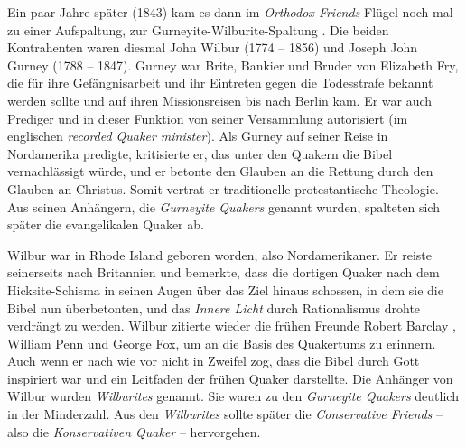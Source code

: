 Ein paar Jahre später (1843) kam es dann im \textit{Orthodox Friends}-Flügel
noch mal zu einer Aufspaltung, zur Gurneyite-Wilburite-Spaltung
. Die beiden
Kontrahenten waren diesmal John Wilbur (1774 -- 1856) und Joseph John Gurney
(1788 -- 1847). Gurney war Brite, Bankier
 und Bruder von Elizabeth Fry, die für
ihre Gefängnisarbeit und ihr Eintreten gegen
die Todesstrafe bekannt werden
sollte und auf ihren Missionsreisen bis nach Berlin kam.
Er war auch Prediger und in dieser Funktion
von seiner
Versammlung autorisiert (im englischen \textit{recorded Quaker minister}). Als
Gurney auf seiner Reise in Nordamerika predigte, kritisierte er, das unter den
Quakern die Bibel vernachlässigt würde, und er betonte den Glauben
an die
Rettung durch den Glauben an Christus. Somit vertrat er traditionelle
protestantische Theologie. Aus seinen
Anhängern, die \textit{Gurneyite Quakers}
genannt wurden, spalteten sich später die evangelikalen Quaker
 ab.

\medskip

Wilbur war in Rhode Island geboren worden, also
Nordamerikaner. Er reiste seinerseits
nach Britannien und bemerkte, dass die dortigen Quaker nach dem Hicksite-Schisma
in seinen Augen über das Ziel hinaus schossen, in dem sie die Bibel nun
überbetonten, und das \textit{Innere Licht} durch Rationalismus drohte verdrängt
zu werden. Wilbur zitierte wieder die frühen Freunde Robert Barclay
, William
Penn und George Fox, um an die Basis des Quakertums zu erinnern. Auch wenn er
nach wie vor nicht in Zweifel zog, dass die Bibel durch Gott inspiriert war und
ein Leitfaden der frühen Quaker darstellte. Die Anhänger von Wilbur wurden
\textit{Wilburites} genannt. Sie waren zu den
\textit{Gurneyite Quakers} deutlich in der Minderzahl.
Aus den \textit{Wilburites} sollte später die
\textit{Conservative Friends} -- also die
\textit{Konservativen Quaker} --
hervorgehen.

\medskip

